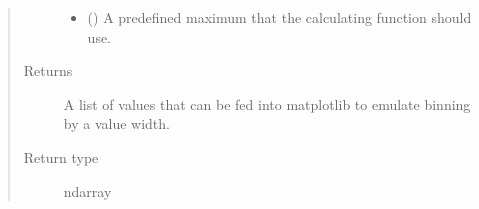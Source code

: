 \documentclass[letterpaper,10pt,english]{sphinxmanual}
\begin{document}
\begin{fulllineitems}
\begin{quote}
\begin{description}
\begin{itemize}
\item {} 
 (\sphinxstyleliteralemphasis{\sphinxupquote{ (}}\sphinxstyleliteralemphasis{\sphinxupquote{)}}) \textendash{} A predefined maximum that the calculating function
should use.

\end{itemize}

\item[{Returns}] \leavevmode
{} \textendash{} A list of values that can be fed into matplotlib to emulate
binning by a value width.

\item[{Return type}] \leavevmode
ndarray

\end{description}\end{quote}

\end{fulllineitems}

\end{document}

